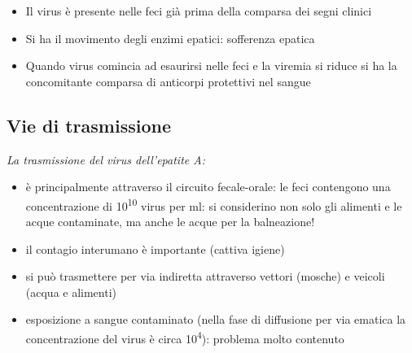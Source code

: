 \begin{itemize}
\item
  Il virus è presente nelle feci già prima della comparsa dei segni
  clinici
\item
  Si ha il movimento degli enzimi epatici: sofferenza epatica
\item
  Quando virus comincia ad esaurirsi nelle feci e la viremia si riduce
  si ha la concomitante comparsa di anticorpi protettivi nel sangue
\end{itemize}

\subsection{Vie di trasmissione}

\emph{La trasmissione del virus dell'epatite A:}

\begin{itemize}
\item
  è principalmente attraverso il circuito fecale-orale: le feci
  contengono una concentrazione di 10\textsuperscript{10} virus per ml:
  si considerino non solo gli alimenti e le acque contaminate, ma anche
  le acque per la balneazione!
\item
  il contagio interumano è importante (cattiva igiene)
\item
  si può trasmettere per via indiretta attraverso vettori (mosche) e
  veicoli (acqua e alimenti)
\item
  esposizione a sangue contaminato (nella fase di diffusione per via
  ematica la concentrazione del virus è circa 10\textsuperscript{4}):
  problema molto contenuto
\end{itemize}
